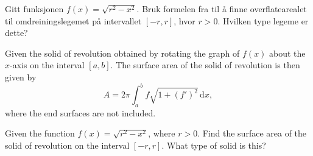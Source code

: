 Gitt funksjonen $f(x)=\sqrt{r^2-x^2}$.
Bruk formelen fra  til å finne overflatearealet til omdreiningslegemet på intervallet $[-r, r]$, hvor $r>0$. Hvilken type legeme er dette?\vsk


Given the solid of revolution obtained by rotating the graph of
$f(x)$ about the $x$-axis on the interval $[a, b]$. The surface
area of the solid of revolution is then given by
\[
A = 2\pi \int_{a}^{b} f\sqrt{1+(f')^2}\,\mathrm{d}x,
\]
where the end surfaces are not included. \vsk

Given the function $f(x)=\sqrt{r^2-x^2}$, where $r>0$.
Find the
surface area of the solid of revolution on the interval $[-r, r]$.
What type of solid is this?

